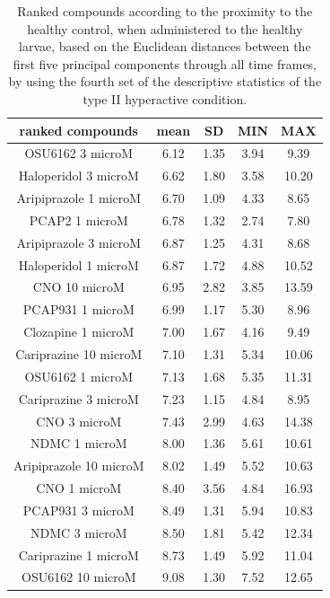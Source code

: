 \begin{table}[h!]\tiny
\centering
\caption{Ranked compounds according to the proximity to the healthy control, when administered to the healthy larvae, based on the Euclidean distances between the first five principal components through all time frames, by using the fourth set of the descriptive statistics of the type II hyperactive condition.}
\begin{tabular}{|c|c|c|c|c|}
\hline
ranked compounds             & mean & SD   & MIN  & MAX   \\ \hline
OSU6162 3 microM       & 6.12  & 1.35 & 3.94 & 9.39  \\ \hline
Haloperidol 3 microM   & 6.62  & 1.80  & 3.58 & 10.20  \\ \hline
Aripiprazole 1 microM  & 6.70   & 1.09 & 4.33 & 8.65  \\ \hline
PCAP2 1 microM         & 6.78  & 1.32 & 2.74 & 7.80   \\ \hline
Aripiprazole 3 microM  & 6.87  & 1.25 & 4.31 & 8.68  \\ \hline
Haloperidol 1 microM   & 6.87  & 1.72 & 4.88 & 10.52 \\ \hline
CNO 10 microM          & 6.95  & 2.82 & 3.85 & 13.59 \\ \hline
PCAP931 1 microM       & 6.99  & 1.17 & 5.30  & 8.96  \\ \hline
Clozapine 1 microM     & 7.00     & 1.67 & 4.16 & 9.49  \\ \hline
Cariprazine 10 microM  & 7.10   & 1.31 & 5.34 & 10.06 \\ \hline
OSU6162 1 microM       & 7.13  & 1.68 & 5.35 & 11.31 \\ \hline
Cariprazine 3 microM   & 7.23  & 1.15 & 4.84 & 8.95  \\ \hline
CNO 3 microM           & 7.43  & 2.99 & 4.63 & 14.38 \\ \hline
NDMC 1 microM          & 8.00     & 1.36 & 5.61 & 10.61 \\ \hline
Aripiprazole 10 microM & 8.02  & 1.49 & 5.52 & 10.63 \\ \hline
CNO 1 microM           & 8.40   & 3.56 & 4.84 & 16.93 \\ \hline
PCAP931 3 microM       & 8.49  & 1.31 & 5.94 & 10.83 \\ \hline
NDMC 3 microM          & 8.50   & 1.81 & 5.42 & 12.34 \\ \hline
Cariprazine 1 microM   & 8.73  & 1.49 & 5.92 & 11.04 \\ \hline
OSU6162 10 microM      & 9.08  & 1.30  & 7.52 & 12.65 \\ \hline

\end{tabular}
\end{table}
